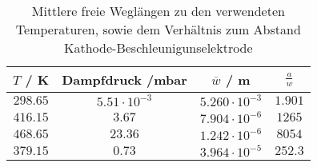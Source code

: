 \begin{table}[!htp]
\centering
\caption{Mittlere freie Weglängen zu den verwendeten Temperaturen, sowie dem Verhältnis zum Abstand Kathode-Beschleunigunselektrode }
\label{tab:weglaenge}
\begin{tabular}{c c c c}
\toprule
{{$T$ / K}} & {{Dampfdruck /mbar}} & {{$\overline{w}$ / m}} & {{$\frac{a}{w}$}} \\
\midrule
$298.65$ & $5.51\cdot 10^{-3} $ & $5.260 \cdot 10^{-3}  $ &  $ 1.901$\\
$416.15$ & $3.67 $ & $7.904 \cdot 10^{-6} $  & $  1265 $ \\
$468.65$ & $23.36$ & $1.242 \cdot 10^{-6} $  & $  8054 $ \\
$379.15$ & $0.73 $ & $3.964 \cdot 10^{-5}  $ &  $ 252.3 $ \\
\bottomrule
\end{tabular}
\end{table}